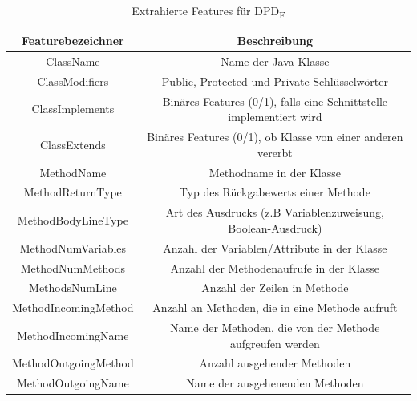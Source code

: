 \begin{table}[H]
    \begin{tabular}{|c|c|}
        \hline
        Featurebezeichner & Beschreibung\\
        \hline
        ClassName & Name der Java Klasse\\
        ClassModifiers & Public, Protected und Private-Schlüsselwörter\\
        ClassImplements & Binäres Features (0/1), falls eine Schnittstelle implementiert wird\\ 
        ClassExtends & Binäres Features (0/1), ob Klasse von einer anderen vererbt\\
        MethodName & Methodname in der Klasse\\
        MethodReturnType & Typ des Rückgabewerts einer Methode\\
        MethodBodyLineType & Art des Ausdrucks (z.B Variablenzuweisung, Boolean-Ausdruck)\\
        MethodNumVariables & Anzahl der Variablen/Attribute in der Klasse\\
        MethodNumMethods & Anzahl der Methodenaufrufe in der Klasse\\
        MethodsNumLine & Anzahl der Zeilen in Methode\\
        MethodIncomingMethod & Anzahl an Methoden, die in eine Methode aufruft\\
        MethodIncomingName & Name der Methoden, die von der Methode aufgreufen werden\\
        MethodOutgoingMethod & Anzahl ausgehender Methoden\\
        MethodOutgoingName & Name der ausgehenenden Methoden\\
        \hline  
    \end{tabular}
    \caption{Extrahierte Features für DPD\textsubscript{F}}
    \label{table:dpdf_features}
\end{table}

